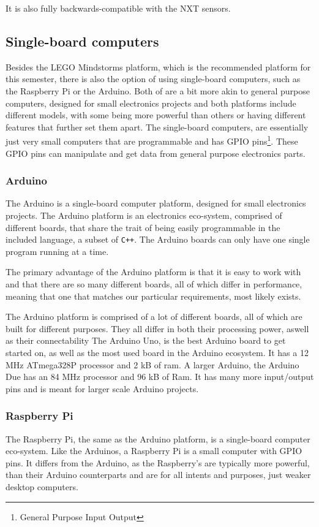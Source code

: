 It is also fully backwards-compatible with the NXT sensors\cite{ev3nxtcompatability}.

\subsection{Single-board computers}
Besides the LEGO Mindstorms platform, which is the recommended platform for this semester, there is also the option of using single-board computers, such as the Raspberry Pi or the Arduino.
Both of are a bit more akin to general purpose computers, designed for small electronics projects and both platforms include different models, with some being more powerful than others or having different features that further set them apart.
The single-board computers, are essentially just very small computers that are programmable and has GPIO pins\footnote{General Purpose Input Output}.
These GPIO pins can manipulate and get data from general purpose electronics parts.

\subsubsection{Arduino}
The Arduino is a single-board computer platform, designed for small electronics projects.
The Arduino platform is an electronics eco-system, comprised of different boards, that share the trait of being easily programmable in the included language, a subset of \texttt{C++}.
The Arduino boards can only have one single program running at a time.

The primary advantage of the Arduino platform is that it is easy to work with and that there are so many different boards, all of which differ in performance, meaning that one that matches our particular requirements, most likely exists.

The Arduino platform is comprised of a lot of different boards, all of which are built for different purposes.
They all differ in both their processing power, aswell as their connectability
The Arduino Uno, is the best Arduino board to get started on, as well as the most used board in the Arduino ecosystem\cite{ArduinoUno3}.
It has a 12 MHz ATmega328P processor and 2 kB of ram.
A larger Arduino, the Arduino Due has an 84 MHz processor and 96 kB of Ram\cite{ArduinoDue}.
It has many more input/output pins and is meant for larger scale Arduino projects.

\subsubsection{Raspberry Pi}
The Raspberry Pi, the same as the Arduino platform, is a single-board computer eco-system.
Like the Arduinos, a Raspberry Pi is a small computer with GPIO pins.
It differs from the Arduino, as the Raspberry's are typically more powerful, than their Arduino counterparts and are for all intents and purposes, just weaker desktop computers.

